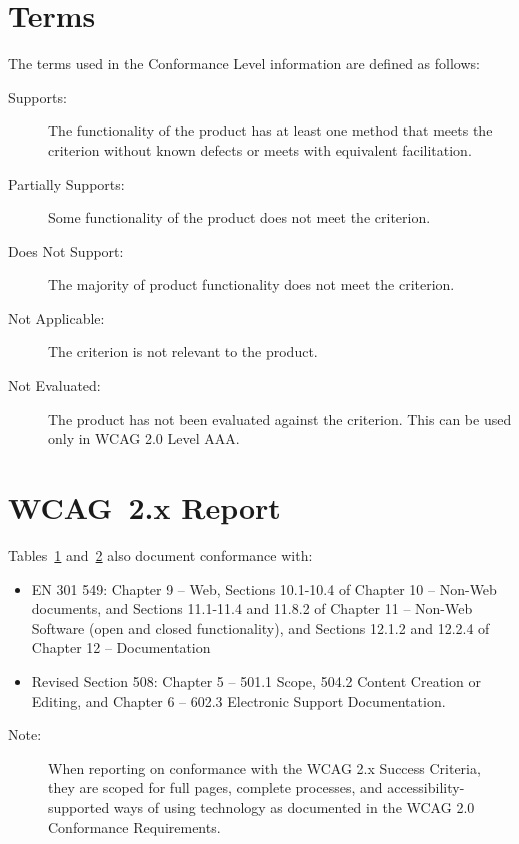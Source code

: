 \documentclass[titlepage]{article}
\begin{document}
\section{Terms}
\label{sec:terms}

The terms used in the Conformance Level information are defined as follows:
\begin{description}
\item[Supports:] The functionality of the product has at least one
  method that meets the criterion without known defects or meets with
  equivalent facilitation.
\item[Partially Supports:] Some functionality of the product does not
  meet the criterion.
\item[Does Not Support:] The majority of product functionality does
  not meet the criterion.
\item[Not Applicable:] The criterion is not relevant to the product.
\item[Not Evaluated:] The product has not been evaluated against the
  criterion. This can be used only in WCAG 2.0 Level AAA.

\end{description}


\clearpage
\section{WCAG~2.x Report}
\label{sec:wcag}

Tables~\hyperref[sec:WCAG-A]{1} and~\hyperref[sec:WCAG-AA]{2} also document 
conformance with: 
\begin{itemize}
\item EN 301 549:  Chapter 9 – Web, Sections 10.1-10.4 of Chapter 10 – 
    Non-Web documents, and Sections 11.1-11.4 and 11.8.2 of Chapter 11 – 
    Non-Web Software (open and closed functionality), and Sections 12.1.2 
    and 12.2.4 of Chapter 12 – Documentation 
\item Revised Section 508: Chapter 5 – 501.1 Scope, 504.2 Content
  Creation or Editing, and Chapter 6 – 602.3 Electronic Support
  Documentation.
\end{itemize}

\begin{description}
\item[Note:] When reporting on conformance with the WCAG 2.x Success
  Criteria, they are scoped for full pages, complete processes, and
  accessibility-supported ways of using technology as documented in
  the WCAG 2.0 Conformance Requirements.
\end{description}
\end{document}
